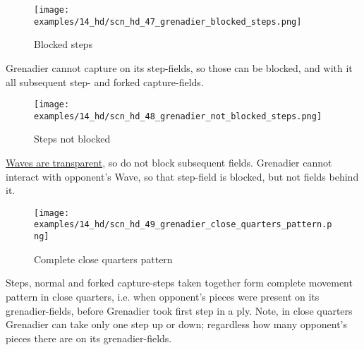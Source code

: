\clearpage %

\vspace*{-1.7\baselineskip}
\noindent
\begin{wrapfigure}[4]{l}{0.41\textwidth}
\centering
\texttt{[image: examples/14\_hd/scn\_hd\_47\_grenadier\_blocked\_steps.png]}
\vspace*{-0.5\baselineskip}
\caption{Blocked steps}
\label{fig:scn_hd_47_grenadier_blocked_steps}
\end{wrapfigure}
Grenadier cannot capture on its step-fields, so those can be blocked, and with it
all subsequent step- and forked capture-fields.


\vspace*{2.3\baselineskip}
\noindent
\begin{wrapfigure}[5]{l}{0.41\textwidth}
\centering
\texttt{[image: examples/14\_hd/scn\_hd\_48\_grenadier\_not\_blocked\_steps.png]}
\vspace*{-0.5\baselineskip}
\caption{Steps not blocked}
\label{fig:scn_hd_48_grenadier_not_blocked_steps}
\end{wrapfigure}
\hyperref[fig:scn_mv_007_wave_is_transparent]{Waves are transparent}, so do not block
subsequent fields. Grenadier cannot interact with opponent's Wave, so that step-field
is blocked, but not fields behind it.

\vspace*{1.0\baselineskip}
\noindent
\begin{figure}[!h]
\texttt{[image: examples/14\_hd/scn\_hd\_49\_grenadier\_close\_quarters\_pattern.png]}
\vspace*{-1.3\baselineskip}
\caption{Complete close quarters pattern}
\label{fig:scn_hd_49_grenadier_close_quarters_pattern}
\end{figure}

\vspace*{-0.5\baselineskip}
Steps, normal and forked capture-steps taken together form complete movement pattern
in close quarters, i.e. when opponent's pieces were present on its grenadier-fields,
before Grenadier took first step in a ply.\newline
\indent
Note, in close quarters Grenadier can take only one step up or down; regardless how
many opponent's pieces there are on its grenadier-fields.

